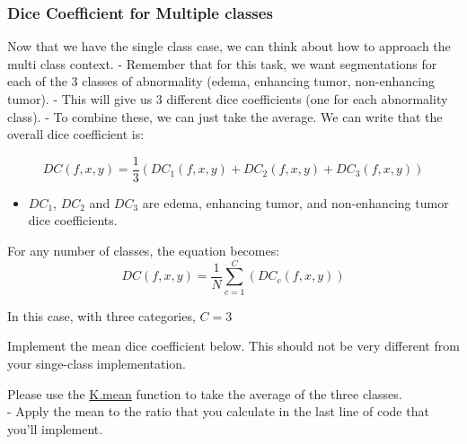 \documentclass[11pt]{article}
\providecommand{\tightlist}{%
      \setlength{\itemsep}{0pt}\setlength{\parskip}{0pt}}
\begin{document}
    \hypertarget{dice-coefficient-for-multiple-classes}{%
\subsubsection{Dice Coefficient for Multiple
classes}\label{dice-coefficient-for-multiple-classes}}

Now that we have the single class case, we can think about how to
approach the multi class context. - Remember that for this task, we want
segmentations for each of the 3 classes of abnormality (edema, enhancing
tumor, non-enhancing tumor). - This will give us 3 different dice
coefficients (one for each abnormality class). - To combine these, we
can just take the average. We can write that the overall dice
coefficient is:

\[DC(f, x, y) = \frac{1}{3} \left ( DC_{1}(f, x, y) + DC_{2}(f, x, y) + DC_{3}(f, x, y) \right )\]

\begin{itemize}
\tightlist
\item
  \(DC_{1}\), \(DC_{2}\) and \(DC_{3}\) are edema, enhancing tumor, and
  non-enhancing tumor dice coefficients.
\end{itemize}

For any number of classes, the equation becomes:\\
\[DC(f, x, y) = \frac{1}{N} \sum_{c=1}^{C} \left ( DC_{c}(f, x, y) \right )\]

In this case, with three categories, \(C = 3\)

Implement the mean dice coefficient below. This should not be very
different from your singe-class implementation.

Please use the \href{https://keras.io/backend/\#mean}{K.mean} function
to take the average of the three classes.\\
- Apply the mean to the ratio that you calculate in the last line of
code that you'll implement.
\end{document}
